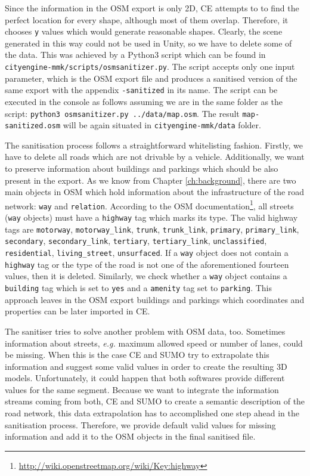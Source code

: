 Since the information in the OSM export is only 2D, CE attempts to to find the perfect location for every shape, although most of them overlap. Therefore, it chooses \texttt{y} values which would generate reasonable shapes. Clearly, the scene generated in this way could not be used in Unity, so we have to delete some of the data. This was achieved by a Python3 script which can be found in \texttt{cityengine-mmk/scripts/osmsanitizer.py}. The script accepts only one input parameter, which is the OSM export file and produces a sanitised version of the same export with the appendix \texttt{-sanitized} in its name. The script can be executed in the console as follows assuming we are in the same folder as the script: \texttt{python3 osmsanitizer.py ../data/map.osm}. The result \texttt{map-sanitized.osm} will be again situated in \texttt{cityengine-mmk/data} folder. 

The sanitisation process follows a straightforward whitelisting fashion. Firstly, we have to delete all roads which are not drivable by a vehicle. Additionally, we want to preserve information about buildings and parkings which should be also present in the export. As we know from Chapter \ref{ch:background}, there are two main objects in OSM which hold information about the infrastructure of the road network: \texttt{way} and \texttt{relation}. According to the OSM documentation\footnote{\url{http://wiki.openstreetmap.org/wiki/Key:highway}}, all streets (\texttt{way} objects) must have a \texttt{highway} tag which marks its type. The valid highway tags are \texttt{motorway}, \texttt{motorway\_link}, \texttt{trunk}, \texttt{trunk\_link}, \texttt{primary}, \texttt{primary\_link}, \texttt{secondary}, \texttt{secondary\_link}, \texttt{tertiary}, \texttt{tertiary\_link}, \texttt{unclassified}, \texttt{residential}, \texttt{living\_street}, \texttt{unsurfaced}. If a \texttt{way} object does not contain a \texttt{highway} tag or the type of the road is not one of the aforementioned fourteen values, then it is deleted. Similarly, we check whether a \texttt{way} object contains a \texttt{building} tag which is set to \texttt{yes} and a \texttt{amenity} tag set to \texttt{parking}. This approach leaves in the OSM export buildings and parkings which coordinates and properties can be later imported in CE.

The sanitiser tries to solve another problem with OSM data, too. Sometimes information about streets, \emph{e.g.} maximum allowed speed or number of lanes, could be missing. When this is the case CE and SUMO try to extrapolate this information and suggest some valid values in order to create the resulting 3D models. Unfortunately, it could happen that both softwares provide different values for the same segment. Because we want to integrate the information streams coming from both, CE and SUMO to create a semantic description of the road network, this data extrapolation has to accomplished one step ahead in the sanitisation process. Therefore, we provide default valid values for missing information and add it to the OSM objects in the final sanitised file.

